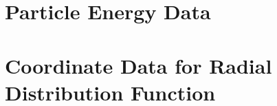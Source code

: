 \documentclass[11pt,a4paper]{article}
\begin{document}
\begin{appendix}
    \newpage
    \section{Particle Energy Data}
    

    \newpage
    \section{Coordinate Data for Radial Distribution Function}
    


    
\end{appendix}
\end{document}
